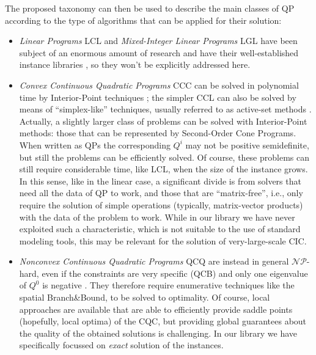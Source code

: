 The proposed taxonomy can then be used to describe the main classes of QP according to the type of algorithms that can be applied for their solution:
%
\begin{itemize}
 \item \emph{Linear Programs} LCL and \emph{Mixed-Integer Linear Programs} LGL have been subject of an enormous amount of research and have their well-established instance libraries \cite{Koch2011}, so they won't be explicitly addressed here.
 \item \emph{Convex Continuous Quadratic Programs} CCC can be solved in polynomial time by Interior-Point techniques \cite{Wright97}; the simpler CCL can also be solved by means of ``simplex-like'' techniques, usually referred to as active-set methods \cite{Dost09}. Actually, a slightly larger class of problems can be solved with Interior-Point methods: those that can be represented by Second-Order Cone Programs. When written as QPs the corresponding $Q^i$ may not be positive semidefinite, but still the problems can be efficiently solved. Of course, these problems can still require considerable time, like LCL, when the size of the instance grows. In this sense, like in the linear case, a significant divide is from solvers that need all the data of QP to work, and those that are ``matrix-free'', i.e., only require the solution of simple operations (typically, matrix-vector products) with the data of the problem to work. While in our library we have never exploited such a characteristic, which is not suitable to the use of standard modeling tools, this may be relevant for the solution of very-large-scale CIC.
 \item \emph{Nonconvex Continuous Quadratic Programs} QCQ are instead in general $\mathcal{NP}$-hard, even if the constraints are very specific (QCB) and only one eigenvalue of $Q^0$ is negative \cite{Hemmecke2010}. They therefore require enumerative techniques like the spatial Branch\&Bound, to be solved to optimality. Of course, local approaches are available that are able to efficiently provide saddle points (hopefully, local optima) of the CQC, but providing global guarantees about the quality of the obtained solutions is challenging. In our library we have specifically focussed on  \emph{exact} solution of the instances.

\end{itemize}
